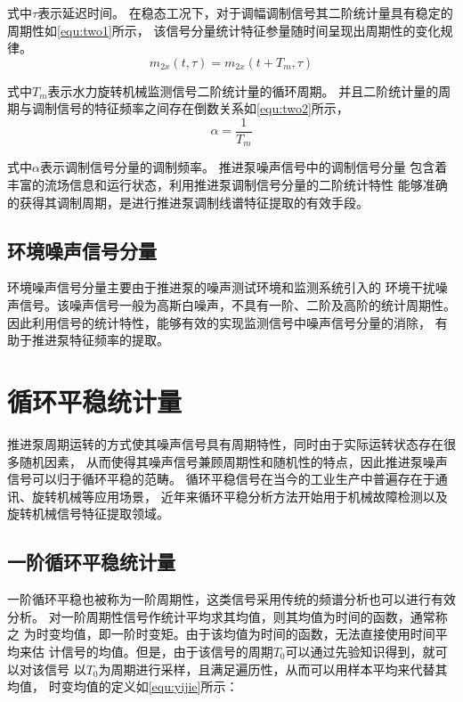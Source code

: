 式中$\tau$表示延迟时间。
在稳态工况下，对于调幅调制信号其二阶统计量具有稳定的周期性如\autoref{equ:two1}所示，
该信号分量统计特征参量随时间呈现出周期性的变化规律。
\begin{equation}
    \label{equ:two1}
    m_{2x}\left ( t, \tau \right )  =m_{2x}\left ( t+T_m, \tau \right )
\end{equation}

式中$T_m$表示水力旋转机械监测信号二阶统计量的循环周期。
并且二阶统计量的周期与调制信号的特征频率之间存在倒数关系如\autoref{equ:two2}所示，
\begin{equation}
    \label{equ:two2}
    \alpha =\frac{1}{T_{m} } 
\end{equation}

式中$\alpha$表示调制信号分量的调制频率。
推进泵噪声信号中的调制信号分量
包含着丰富的流场信息和运行状态，利用推进泵调制信号分量的二阶统计特性
能够准确的获得其调制周期，是进行推进泵调制线谱特征提取的有效手段。
\subsection{环境噪声信号分量}
环境噪声信号分量主要由于推进泵的噪声测试环境和监测系统引入的
环境干扰噪声信号。该噪声信号一般为高斯白噪声，不具有一阶、二阶及高阶的统计周期性。
因此利用信号的统计特性，能够有效的实现监测信号中噪声信号分量的消除，
有助于推进泵特征频率的提取。

\section{循环平稳统计量}
推进泵周期运转的方式使其噪声信号具有周期特性，同时由于实际运转状态存在很多随机因素，
从而使得其噪声信号兼顾周期性和随机性的特点，因此推进泵噪声信号可以归于循环平稳的范畴。
循环平稳信号在当今的工业生产中普遍存在于通讯、旋转机械等应用场景，
近年来循环平稳分析方法开始用于机械故障检测以及旋转机械信号特征提取领域。
\subsection{一阶循环平稳统计量}
一阶循环平稳也被称为一阶周期性，这类信号采用传统的频谱分析也可以进行有效分析。
对一阶周期性信号作统计平均求其均值，则其均值为时间的函数，通常称之
为时变均值，即一阶时变矩。由于该均值为时间的函数，无法直接使用时间平均来估
计信号的均值\cite{zhou2006}。但是，由于该信号的周期$T_{0}$可以通过先验知识得到，就可以对该信号
以$T_{0}$为周期进行采样，且满足遍历性，从而可以用样本平均来代替其均值，
时变均值的定义如\autoref{equ:yijie}所示：

